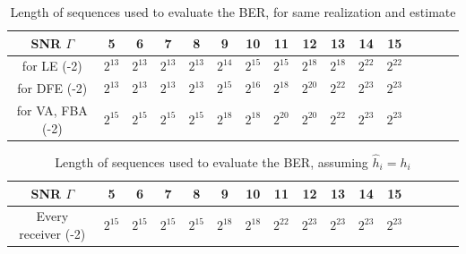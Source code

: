 \documentclass[10pt]{article}
\begin{document}
\begin{table}[h!]
	\begin{tabular}{c|c|c|c|c|c|c|c|c|c|c|c|c|c|c|c}
	SNR $\Gamma$	&	5	&	6	&	7	&	8	&	9	&	10	&	11	&	12	&	13	&	14	&	15 \\ \hline	
	for LE 	(-2)	& $2^{13}$ & $2^{13}$ & $2^{13}$ & $2^{13}$ & $2^{14}$ & $2^{15}$ & $2^{15}$ & $2^{18}$ & $2^{18}$ & $2^{22}$ & $2^{22}$  \\
	for DFE (-2)	& $2^{13}$ & $2^{13}$ & $2^{13}$ & $2^{13}$ & $2^{15}$ & $2^{16}$ & $2^{18}$ & $2^{20}$ & $2^{22}$ & $2^{23}$ & $2^{23}$  \\
	for VA, FBA (-2)& $2^{15}$ & $2^{15}$ & $2^{15}$ & $2^{15}$ & $2^{18}$ & $2^{18}$ & $2^{20}$ & $2^{20}$ & $2^{22}$ & $2^{23}$ & $2^{23}$  \\
	\end{tabular}
	\caption{Length of sequences used to evaluate the BER, for same realization and estimate}
	\label{table:BER_same_len}
\end{table}

\begin{table}[h!]
	\begin{tabular}{c|c|c|c|c|c|c|c|c|c|c|c|c|c|c|c}
	SNR $\Gamma$	&	5	&	6	&	7	&	8	&	9	&	10	&	11	&	12	&	13	&	14	&	15 \\ \hline	
	Every receiver (-2) & $2^{15}$ & $2^{15}$ & $2^{15}$ & $2^{15}$ & $2^{18}$ & $2^{18}$ & $2^{22}$ & $2^{23}$ & $2^{23}$ & $2^{23}$ & $2^{23}$  \\
	\end{tabular}
	\caption{Length of sequences used to evaluate the BER, assuming $\hat{h}_i = h_i$}
	\label{table:BER_real_len}
\end{table}
\end{document}
